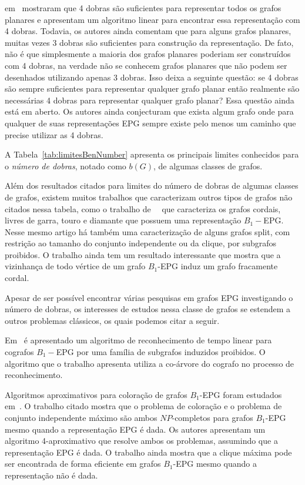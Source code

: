 \citeauthor{daniel2014b} em~\cite{daniel2014b} mostraram que 4 dobras são suficientes para representar todos os grafos planares  e apresentam um algoritmo linear para encontrar essa representação com 4 dobras. Todavia, os autores ainda comentam que para alguns grafos planares, muitas vezes 3 dobras são suficientes para construção da representação. De fato, não é que simplesmente a maioria dos grafos planares poderiam ser construídos com 4 dobras, na verdade não se conhecem grafos planares que não podem ser desenhados utilizando apenas 3 dobras.   Isso deixa a seguinte questão: se 4 dobras são sempre suficientes para representar qualquer grafo planar então realmente são necessárias 4 dobras para representar qualquer grafo planar? Essa questão ainda está em aberto. Os autores ainda conjecturam que exista algum grafo onde para qualquer de suas representações EPG sempre existe pelo menos um caminho que precise utilizar as 4 dobras.

A Tabela~\ref{tab:limitesBenNumber} apresenta os principais limites conhecidos para o \textit{número de dobras}, notado como $b(G)$, de algumas classes de grafos.  




Além dos resultados citados para limites do número de dobras de algumas classes de grafos, existem muitos trabalhos que caracterizam outros tipos de grafos não citados nessa tabela, como o trabalho de~\citeauthor{ries2009}~\citep{ries2009} que caracteriza os grafos cordais, livres de garra, touro e diamante que possuem uma representação $B_{1}-$EPG. Nesse mesmo artigo há também uma caracterização de alguns grafos split, com restrição ao tamanho do conjunto independente ou da clique, por subgrafos proibidos. O trabalho ainda tem um resultado interessante que mostra que a vizinhança de todo vértice de um grafo $B_1$-EPG induz um grafo fracamente cordal.

Apesar de ser possível encontrar várias pesquisas em grafos EPG investigando o número de dobras, os interesses de estudos nessa classe de grafos se estendem a outros problemas clássicos, os quais podemos citar a seguir.

Em~\citet{cohen2014} é apresentado um algoritmo de reconhecimento de tempo linear para cografos $B_{1}-$EPG por uma família de subgrafos induzidos proibidos. O algoritmo que o trabalho apresenta utiliza a co-árvore do cografo no processo de reconhecimento.
 
 Algoritmos aproximativos para coloração de grafos $B_1$-EPG foram estudados em~\cite{epstein2013approximation}. O trabalho citado mostra que o problema de coloração e o problema de conjunto independente máximo são ambos $NP$-completos para grafos $B_1$-EPG mesmo quando a representação EPG é dada. Os autores apresentam um algoritmo  4-aproximativo que resolve ambos os problemas, assumindo que a representação EPG é dada. O trabalho ainda mostra que a clique máxima pode ser encontrada de forma eficiente em grafos $B_1$-EPG mesmo quando a representação não é dada.
 
